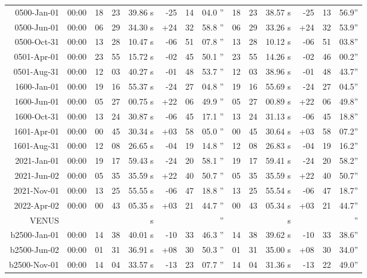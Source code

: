 \begin{longtable}{r@{\,}r|r@{h}r@{m}r<{s}|r@{°}r@{'}r<{''}||r@{h}r@{m}r<{s}|r@{°}r@{'}r<{''}}
 0500-Jan-01 & 00:00  &   18 & 23 & 39.86 & -25 & 14 & 04.0 & 18&23&38.57 & -25&13&56.9\\ %
 0500-Jun-01 & 00:00  &   06 & 29 & 34.30 & +24 & 32 & 58.8 & 06&29&33.26 & +24&32&53.9\\ %
 0500-Oct-31 & 00:00  &   13 & 28 & 10.47 & -06 & 51 & 07.8 & 13&28&10.12 & -06&51&03.8\\ %
 0501-Apr-01 & 00:00  &   23 & 55 & 15.72 & -02 & 45 & 50.1 & 23&55&14.26 & -02&46&00.2\\ %
 0501-Aug-31 & 00:00  &   12 & 03 & 40.27 & -01 & 48 & 53.7 & 12&03&38.96 & -01&48&43.7\\ %
 1600-Jan-01 & 00:00  &   19 & 16 & 55.37 & -24 & 27 & 04.8 & 19&16&55.69 & -24&27&04.5\\ %
 1600-Jun-01 & 00:00  &   05 & 27 & 00.75 & +22 & 06 & 49.9 & 05&27&00.89 & +22&06&49.8\\ %
 1600-Oct-31 & 00:00  &   13 & 24 & 30.87 & -06 & 45 & 17.1 & 13&24&31.13 & -06&45&18.8\\ %
 1601-Apr-01 & 00:00  &   00 & 45 & 30.34 & +03 & 58 & 05.0 & 00&45&30.64 & +03&58&07.2\\ %
 1601-Aug-31 & 00:00  &   12 & 08 & 26.65 & -04 & 19 & 14.8 & 12&08&26.83 & -04&19&16.2\\ %
 2021-Jan-01 & 00:00  &   19 & 17 & 59.43 & -24 & 20 & 58.1 & 19&17&59.41 & -24&20&58.2\\ %
 2021-Jun-02 & 00:00  &   05 & 35 & 35.59 & +22 & 40 & 50.7 & 05&35&35.59 & +22&40&50.7\\ %
 2021-Nov-01 & 00:00  &   13 & 25 & 55.55 & -06 & 47 & 18.8 & 13&25&55.54 & -06&47&18.7\\ %
 2022-Apr-02 & 00:00  &   00 & 43 & 05.35 & +03 & 21 & 44.7 & 00&43&05.34 & +03&21&44.7\\ %
VENUS    \\
b2500-Jan-01 & 00:00  &   14 & 38 & 40.01 & -10 & 33 & 46.3 & 14&38&39.62 & -10&33&38.6\\ %
b2500-Jun-02 & 00:00  &   01 & 31 & 36.91 & +08 & 30 & 50.3 & 01&31&35.00 & +08&30&34.0\\ %
b2500-Nov-01 & 00:00  &   14 & 04 & 33.57 & -13 & 23 & 07.7 & 14&04&31.36 & -13&22&49.0\\ %

\end{longtable}

